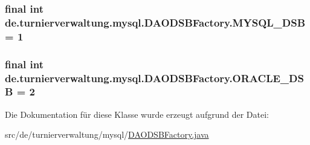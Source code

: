 \subsubsection[{\texorpdfstring{M\+Y\+S\+Q\+L\+\_\+\+D\+SB}{MYSQL_DSB}}]{\setlength{\rightskip}{0pt plus 5cm}final int de.\+turnierverwaltung.\+mysql.\+D\+A\+O\+D\+S\+B\+Factory.\+M\+Y\+S\+Q\+L\+\_\+\+D\+SB = 1\hspace{0.3cm}{\ttfamily [static]}}\hypertarget{classde_1_1turnierverwaltung_1_1mysql_1_1_d_a_o_d_s_b_factory_a2e8a98a93ca2dac660edef6f2d70989e}{}\label{classde_1_1turnierverwaltung_1_1mysql_1_1_d_a_o_d_s_b_factory_a2e8a98a93ca2dac660edef6f2d70989e}
\subsubsection[{\texorpdfstring{O\+R\+A\+C\+L\+E\+\_\+\+D\+SB}{ORACLE_DSB}}]{\setlength{\rightskip}{0pt plus 5cm}final int de.\+turnierverwaltung.\+mysql.\+D\+A\+O\+D\+S\+B\+Factory.\+O\+R\+A\+C\+L\+E\+\_\+\+D\+SB = 2\hspace{0.3cm}{\ttfamily [static]}}\hypertarget{classde_1_1turnierverwaltung_1_1mysql_1_1_d_a_o_d_s_b_factory_aa1ebf5855f35a1759227b4b26cee98b2}{}\label{classde_1_1turnierverwaltung_1_1mysql_1_1_d_a_o_d_s_b_factory_aa1ebf5855f35a1759227b4b26cee98b2}


Die Dokumentation für diese Klasse wurde erzeugt aufgrund der Datei\+:\begin{DoxyCompactItemize}
\item 
src/de/turnierverwaltung/mysql/\hyperlink{_d_a_o_d_s_b_factory_8java}{D\+A\+O\+D\+S\+B\+Factory.\+java}\end{DoxyCompactItemize}
